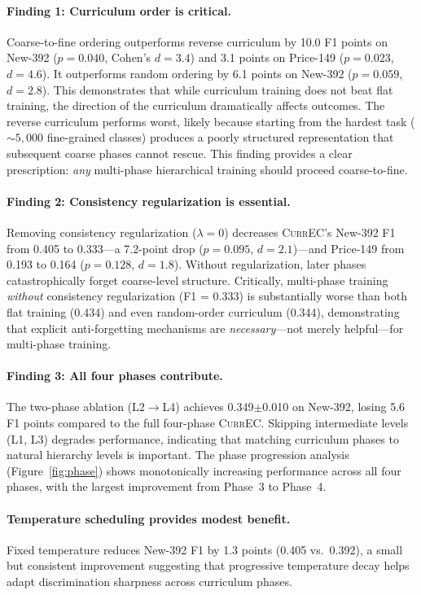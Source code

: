 \documentclass{article}
\newcommand{\currec}{\textsc{CurrEC}}
\begin{document}
\paragraph{Finding 1: Curriculum order is critical.}
Coarse-to-fine ordering outperforms reverse curriculum by 10.0 F1 points on New-392 ($p = 0.040$, Cohen's $d = 3.4$) and 3.1 points on Price-149 ($p = 0.023$, $d = 4.6$). It outperforms random ordering by 6.1 points on New-392 ($p = 0.059$, $d = 2.8$). This demonstrates that while curriculum training does not beat flat training, the direction of the curriculum dramatically affects outcomes. The reverse curriculum performs worst, likely because starting from the hardest task (${\sim}5{,}000$ fine-grained classes) produces a poorly structured representation that subsequent coarse phases cannot rescue. This finding provides a clear prescription: \emph{any} multi-phase hierarchical training should proceed coarse-to-fine.

\paragraph{Finding 2: Consistency regularization is essential.}
Removing consistency regularization ($\lambda = 0$) decreases \currec{}'s New-392 F1 from 0.405 to 0.333---a 7.2-point drop ($p = 0.095$, $d = 2.1$)---and Price-149 from 0.193 to 0.164 ($p = 0.128$, $d = 1.8$). Without regularization, later phases catastrophically forget coarse-level structure. Critically, multi-phase training \emph{without} consistency regularization (F1 = 0.333) is substantially worse than both flat training (0.434) and even random-order curriculum (0.344), demonstrating that explicit anti-forgetting mechanisms are \emph{necessary}---not merely helpful---for multi-phase training.

\paragraph{Finding 3: All four phases contribute.}
The two-phase ablation (L2$\rightarrow$L4) achieves 0.349{\scriptsize $\pm$0.010} on New-392, losing 5.6 F1 points compared to the full four-phase \currec{}. Skipping intermediate levels (L1, L3) degrades performance, indicating that matching curriculum phases to natural hierarchy levels is important. The phase progression analysis (Figure~\ref{fig:phase}) shows monotonically increasing performance across all four phases, with the largest improvement from Phase~3 to Phase~4.

\paragraph{Temperature scheduling provides modest benefit.}
Fixed temperature reduces New-392 F1 by 1.3 points (0.405 vs.\ 0.392), a small but consistent improvement suggesting that progressive temperature decay helps adapt discrimination sharpness across curriculum phases.
\end{document}
